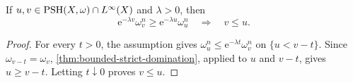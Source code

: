 \begin{corollary}\label{cor:bounded-exponential-comparison}
If $u,v\in\mathrm{PSH}(X,\omega)\cap L^\infty(X)$ and $\lambda>0$, then
\[
 \mathrm{e}^{-\lambda v}\omega_v^n\geq \mathrm{e}^{-\lambda u}\omega_u^n
 \quad\Longrightarrow\quad v\leq u.
\]
\end{corollary}
\begin{proof}
For every $t>0$, the assumption gives
$\omega_u^n\leq \mathrm{e}^{-\lambda t}\omega_v^n$ on $\{u<v-t\}$. Since $\omega_{v-t}=\omega_v$, \cref{thm:bounded-strict-domination}, applied to $u$ and $v-t$, gives $u\geq v-t$. Letting $t\downarrow0$ proves $v\leq u$.
\end{proof}
